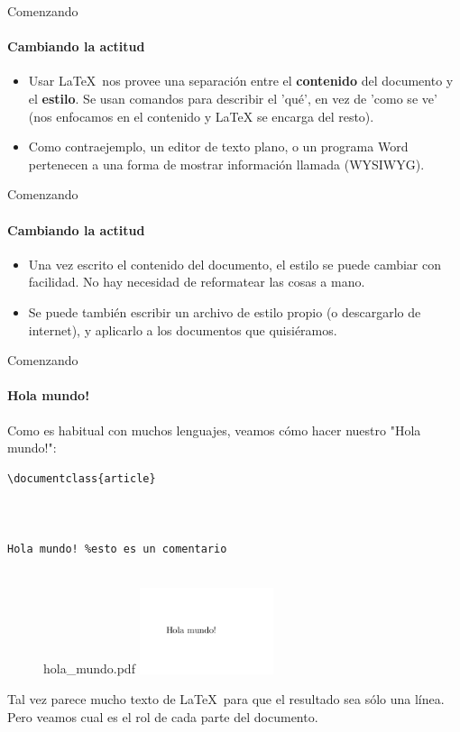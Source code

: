 \begin{frame}[fragile]{Comenzando}
    \framesubtitle{Cambiando la actitud}
    \begin{itemize}
        \item Usar \LaTeX\ nos provee una separación entre el \textbf{contenido} del documento y el \textbf{estilo}. Se usan comandos para describir el 'qué', en vez de 'como se ve' (nos enfocamos en el contenido y \LaTeX{}  se encarga del resto).
        \item Como contraejemplo, un editor de texto plano, o un programa Word pertenecen a una forma de mostrar información llamada  (WYSIWYG).
    \end{itemize}

\end{frame}

\begin{frame}[fragile]{Comenzando}
    \framesubtitle{Cambiando la actitud}
    \begin{itemize}
        \item Una vez escrito el contenido del documento, el estilo se puede cambiar con facilidad. No hay necesidad de reformatear las cosas a mano.
        \item Se puede también escribir un archivo de estilo propio (o descargarlo de internet), y aplicarlo a los documentos que quisiéramos.
        
    \end{itemize}

\end{frame}


\begin{frame}[fragile]{Comenzando}
\framesubtitle{Hola mundo!}

Como es habitual con muchos lenguajes, veamos cómo hacer nuestro "Hola mundo!":

\begin{multicols}{2}
\begin{lstlisting}[title={hola\_mundo.tex}]
\documentclass{article}



Hola mundo! %esto es un comentario


\end{lstlisting}

\begin{figure}
hola\_mundo.pdf
\includegraphics[width=0.35\textwidth]{../images/ejemplo_hola_mundo.png}
\end{figure}

\end{multicols}
\pause
Tal vez parece mucho texto de \LaTeX\ para que el resultado sea sólo una línea. Pero veamos cual es el rol de cada parte del documento.

\end{frame}

